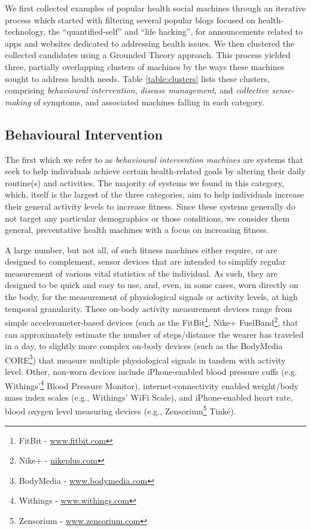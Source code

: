 \documentclass{www13-companion-accepted}
\begin{document}
We first collected examples of popular health social machines through
an iterative process which started with filtering several popular blogs
focused on health-technology, the ``quantified-self'' and ``life
hacking'', for announcements related to apps and websites dedicated to
addressing health issues. We then clustered the collected candidates
using a Grounded Theory approach.  This process yielded three,
partially overlapping clusters of machines by the ways these machines
sought to address health needs.  Table \ref{table:clusters} lists these
clusters, comprising \emph{behavioural intervention}, \emph{disease
  management}, and \emph{collective sense-making} of symptoms, and
associated machines falling in each category.

\subsection{Behavioural Intervention}

The first which we refer to as \emph{behavioural intervention
  machines} are systems that seek to help individuals achieve certain
health-related goals by altering their daily routine(s) and
activities.  The majority of systems we found in this category, which,
itself is the largest of the three categories, aim to help individuals
increase their general activity levels to increase fitness.  Since
these systems generally do not target any particular demographics or
those conditions, we consider them general, preventative health
machines with a focus on increasing fitness.

A large number, but not all, of such fitness machines either require,
or are designed to complement, sensor devices that are intended to
simplify regular measurement of various vital statistics of the
individual.  As such, they are designed to be quick and easy to use,
and, even, in some cases, worn directly on the body, for the
measurement of physiological signals or activity levels, at high
temporal granularity. These on-body activity measurement devices range
from simple accelerometer-based devices (such as the
FitBit\footnote{FitBit - \url{www.fitbit.com}}, Nike+ FuelBand\footnote{Nike+ -
  \url{nikeplus.com}}, that can approximately estimate the number of
steps/distance the wearer has traveled in a day, to slightly more
complex on-body devices (such as the BodyMedia CORE\footnote{BodyMedia
  - \url{www.bodymedia.com}}) that measure multiple physiological
signals in tandem with activity level.  Other, non-worn devices
include iPhone-enabled blood pressure cuffs
(e.g. Withings'\footnote{Withings - \url{www.withings.com}} Blood
Pressure Monitor), internet-connectivity enabled weight/body mass
index scales (e.g., Withings' WiFi Scale), and iPhone-enabled heart
rate, blood oxygen level measuring devices (e.g.,
Zensorium\footnote{Zensorium - \url{www.zensorium.com}} Tink\'{e}).
\end{document}

